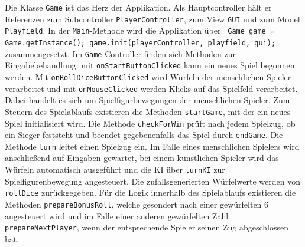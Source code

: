 \documentclass[conference]{IEEEtran}
\begin{document}
Die Klasse \texttt{Game} ist das Herz der Applikation. Als Hauptcontroller h\"alt er Referenzen zum Subcontroller \texttt{PlayerController}, zum View \texttt{GUI} und zum Model \texttt{Playfield}. In der \texttt{Main}-Methode wird die Applikation \"uber \texttt{ Game game = Game.getInstance(); game.init(playerController, playfield, gui);} zusammengesetzt. Im \texttt{Game}-Controller finden sich Methoden zur Eingabebehandlung: mit \texttt{onStartButtonClicked} kann ein neues Spiel begonnen werden. Mit \texttt{onRollDiceButtonClicked} wird W\"urfeln der menschlichen Spieler verarbeitet und mit \texttt{onMouseClicked} werden Klicks auf das Spielfeld verarbeitet. Dabei handelt es sich um Spielfigurbewegungen der menschlichen Spieler.
Zum Steuern des Spielablaufs existieren die Methoden \texttt{startGame}, mit der ein neues Spiel initialisiert wird.
Die Methode \texttt{checkForWin} pr\"uft nach jedem Spielzug, ob ein Sieger feststeht und beendet gegebenenfalls das Spiel durch
\texttt{endGame}.
Die Methode \texttt{turn} leitet einen Spielzug ein. Im Falle eines menschlichen Spielers wird anschlie\ss end auf Eingaben gewartet, bei einem k\"unstlichen Spieler wird das W\"urfeln automatisch ausgef\"uhrt und die KI \"uber \texttt{turnKI} zur Spielfigurenbewegung angesteuert. Die zufallsgenerierten W\"urfelwerte
werden von \texttt{rollDice} zur\"uckgegeben. F\"ur die Logik innerhalb des Spielablaufs existieren die Methoden
\texttt{prepareBonusRoll}, welche gesondert nach einer gew\"urfelten 6 angesteuert wird und im Falle einer anderen gew\"urfelten Zahl
\texttt{prepareNextPlayer}, wenn der entsprechende Spieler seinen Zug abgeschlossen hat.
\end{document}
